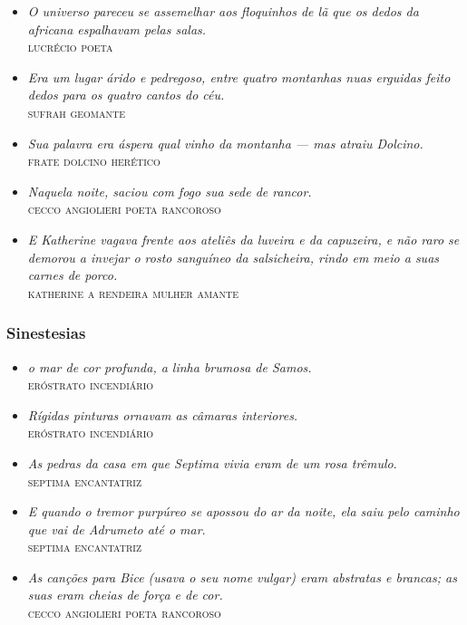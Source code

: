 \documentclass[12pt]{extarticle}
\begin{document}
\begin{itemize}
\item\emph{O universo pareceu se assemelhar aos floquinhos de lã que os
dedos da africana espalhavam pelas salas.}\\
\textsc{lucrécio poeta}

\item\emph{Era um lugar árido e pedregoso, entre quatro montanhas nuas
erguidas feito dedos para os quatro cantos do céu.}\\
\textsc{sufrah geomante}

\item\emph{Sua palavra era áspera qual vinho da montanha --- mas atraiu
Dolcino.}\\
\textsc{frate dolcino herético}

\item\emph{Naquela noite, saciou com fogo sua sede de rancor.}\\ 
\textsc{cecco angiolieri poeta rancoroso}

\item\emph{E Katherine vagava frente aos ateliês da luveira e da capuzeira,
e não raro se demorou a invejar o rosto sanguíneo da salsicheira, rindo
em meio a suas carnes de porco.}\\
\textsc{katherine a rendeira mulher amante}
\end{itemize}

\subsubsection{Sinestesias}

\begin{itemize}
\item\emph{o mar de cor profunda, a linha brumosa de Samos.}\\
\textsc{eróstrato incendiário}

\item\emph{Rígidas pinturas ornavam as câmaras interiores.}\\
\textsc{eróstrato incendiário}

\item\emph{As pedras da casa em que Septima vivia eram de um rosa
trêmulo}.\\
\textsc{septima encantatriz}

\item\emph{E quando o tremor purpúreo se apossou do ar da noite, ela saiu
pelo caminho que vai de Adrumeto até o mar}.\\
\textsc{septima encantatriz}

\item\emph{As canções para Bice (usava o seu nome vulgar) eram abstratas e
brancas; as suas eram cheias de força e de cor.}\\
\textsc{cecco angiolieri poeta rancoroso}
\end{itemize}
\end{document}
